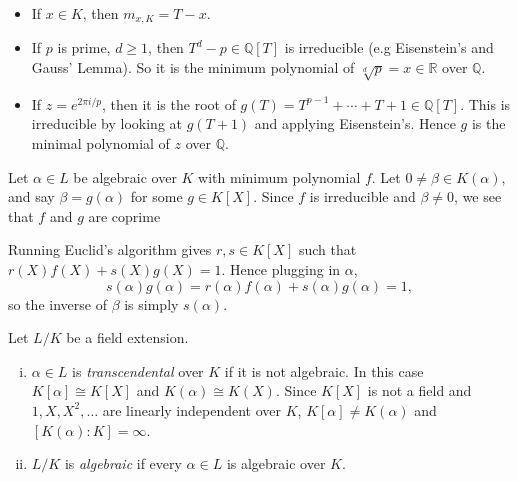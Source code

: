 \documentclass[12pt]{article}
\begin{document}
\begin{exbox}
	\begin{itemize}
		\item If $x \in K$, then $m_{x, K} = T - x$.
		\item If $p$ is prime, $d \geq 1$, then $T^{d} - p \in \mathbb{Q}[T]$ is irreducible (e.g Eisenstein's and Gauss' Lemma). So it is the minimum polynomial of $\sqrt[d]{p} = x \in \mathbb{R}$ over $\mathbb{Q}$.
		\item If $z = e^{2 \pi i/p}$, then it is the root of $g(T) = T^{p-1} + \cdots + T + 1 \in \mathbb{Q}[T]$. This is irreducible by looking at $g(T+1)$ and applying Eisenstein's. Hence $g$ is the minimal polynomial of $z$ over $\mathbb{Q}$.
	\end{itemize}	
\end{exbox}

Let $\alpha \in L$ be algebraic over $K$ with minimum polynomial $f$. Let $0 \neq \beta \in K(\alpha)$, and say $\beta = g(\alpha)$ for some $g \in K[X]$. Since $f$ is irreducible and $\beta \neq 0$, we see that $f$ and $g$ are coprime

Running Euclid's algorithm gives $r, s \in K[X]$ such that $r(X)f(X) + s(X)g(X) = 1$. Hence plugging in $\alpha$,
\[
s(\alpha)g(\alpha) = r(\alpha)f(\alpha) + s(\alpha)g(\alpha) = 1,
\]
so the inverse of $\beta$ is simply $s(\alpha)$.


\begin{definition}
	Let $L/K$ be a field extension.
	\begin{enumerate}[(i)]
		\item $\alpha \in L$ is \emph{transcendental} over $K$ if it is not algebraic. In this case $K[\alpha] \cong K[X]$ and $K(\alpha) \cong K(X)$. Since $K[X]$ is not a field and $1, X, X^2, \ldots$ are linearly independent over $K$, $K[\alpha] \neq K(\alpha)$ and $[K(\alpha) : K] = \infty$.
		\item $L/K$ is \emph{algebraic} if every $\alpha \in L$ is algebraic over $K$.
	\end{enumerate}
\end{definition}
\end{document}
